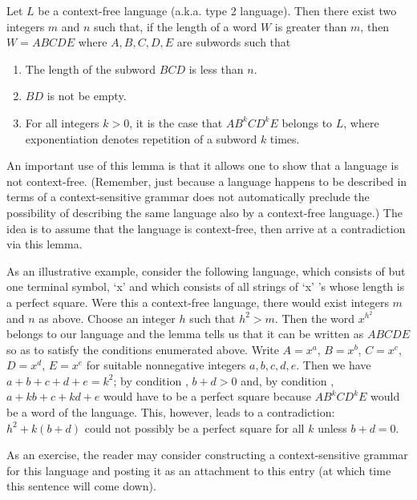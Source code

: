 \documentclass[12pt]{article}
\begin{document}
Let $L$ be a context-free language (a.k.a. type 2 language).  Then there exist
two integers $m$ and $n$ such that, if the length of a word $W$ is greater
than $m$, then $W = ABCDE$ where $A,B,C,D,E$ are subwords such that
\begin{enumerate}
\item The length of the subword $BCD$ is less than $n$.
\item $BD$ is not be empty.
\item For all integers $k > 0$, it is the case that $AB^kCD^kE$ belongs to $L$,
where exponentiation denotes repetition of a subword $k$ times.
\end{enumerate}

An important use of this lemma is that it allows one to show that a language
is not context-free. (Remember, just because a language happens to be described 
in terms of a context-sensitive grammar does not automatically preclude the
possibility of describing the same language also  by a 
context-free language.)  The idea is to assume that the language is
context-free, then arrive at a contradiction via this lemma.

As an illustrative example, consider the following language, which consists of
but one terminal symbol, `x' and which consists of all strings of `x' 's whose
length is a perfect square.  Were this a context-free language, there would 
exist integers $m$ and $n$ as above.  Choose an integer $h$ such that $h^2 > m$.
Then the word $x^{h^2}$ belongs to our language and the lemma tells us that
it can be written as $ABCDE$ so as to satisfy the conditions enumerated above.
Write $A = x^a$, $B = x^b$, $C = x^c$, $D = x^d$, $E = x^e$ for suitable nonnegative integers $a,b,c,d,e$.  Then we have $a + b + c + d + e = k^2$;
by condition , $b + d > 0$ and, by condition , $a + kb + c + kd + e$ would 
have to be a perfect square because $AB^kCD^kE$ would be a word of the
language.  This, however, leads to a contradiction: $h^2 + k (b + d)$ 
could not possibly be a perfect square for all $k$ unless $b + d = 0$.

As an exercise, the reader may consider constructing a context-sensitive
grammar for this language and posting it as an attachment to this entry 
(at which time this sentence will come down).
\end{document}
